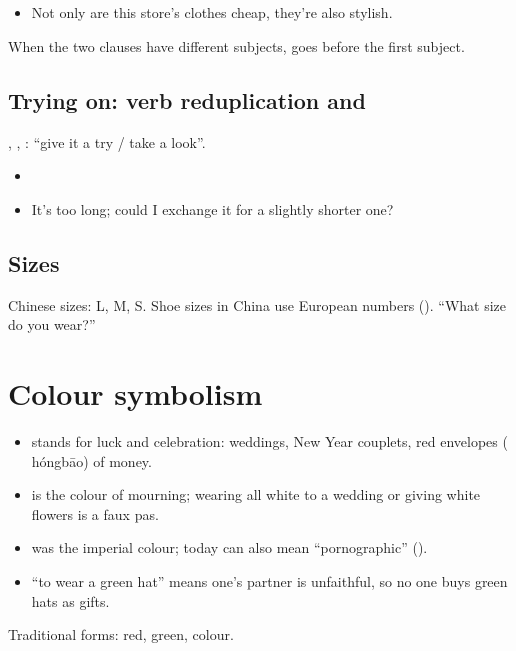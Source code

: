 \subsection{}

\begin{itemize}
  \item {} Not only are this store's clothes
        cheap, they're also stylish.
\end{itemize}
When the two clauses have different subjects,  goes before the first subject.

\subsection{Trying on: verb reduplication and }

, , : ``give it a try / take a look''.
\begin{itemize}
  \item {}
  \item {} It's too long; could I exchange it for a
        slightly shorter one?
\end{itemize}

\subsection{Sizes}

Chinese sizes:  L,  M,  S. Shoe sizes in China use European
numbers ().  ``What size do you wear?''

\section{Colour symbolism}

\begin{aside}
\begin{itemize}
  \item {} stands for luck and celebration: weddings, New Year couplets, red
        envelopes ( hóngbāo) of money.
  \item {} is the colour of mourning; wearing all white to a wedding or giving white
        flowers is a faux pas.
  \item {} was the imperial colour; today  can also mean ``pornographic''
        ().
  \item {} ``to wear a green hat'' means one's partner is unfaithful, so no one
        buys green hats as gifts.
\end{itemize}
Traditional forms:  red,  green,  colour.
\end{aside}

